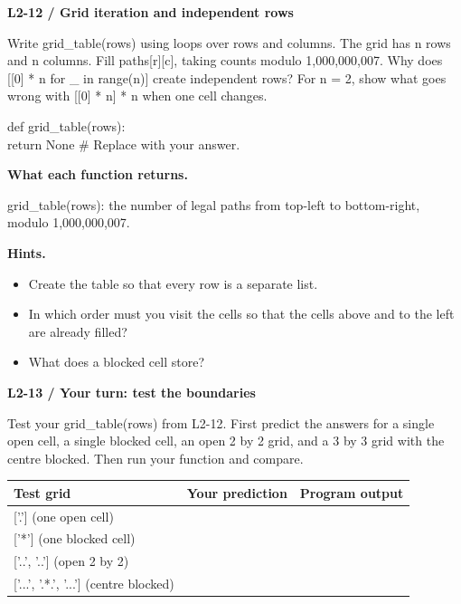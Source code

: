 \documentclass[11pt,a4paper]{article}
\begin{document}
\par\noindent\begin{minipage}{\linewidth}
\textbf{L2-12 / Grid iteration and independent rows}\par\smallskip Write grid\_table(rows) using loops over rows and columns. The grid has n rows and n columns. Fill paths[r][c], taking counts modulo 1,000,000,007. Why does [[0] * n for \_ in range(n)] create independent rows? For n = 2, show what goes wrong with [[0] * n] * n when one cell changes.\par
\par{}\par\smallskip\noindent\colorbox{codepaper}{\parbox{\dimexpr\linewidth-2\fboxsep\relax}{\small\ttfamily\raggedright def grid\_table(rows):\\\hspace*{2.4em}return None  \# Replace with your answer.}}\par
{\small\textbf{What each function returns.}\par grid\_table(rows): the number of legal paths from top-left to bottom-right, modulo 1,000,000,007.\par }
{\small\textbf{Hints.}}\begin{itemize}\item Create the table so that every row is a separate list.\item In which order must you visit the cells so that the cells above and to the left are already filled?\item What does a blocked cell store?\end{itemize}
\end{minipage}\par\vspace{4mm}
\par\noindent\begin{minipage}{\linewidth}
\textbf{L2-13 / Your turn: test the boundaries}\par\smallskip Test your grid\_table(rows) from L2-12. First predict the answers for a single open cell, a single blocked cell, an open 2 by 2 grid, and a 3 by 3 grid with the centre blocked. Then run your function and compare.\par
\par\medskip \begingroup\small\setlength{\tabcolsep}{4pt}\renewcommand{\arraystretch}{1.35}\begin{tabularx}{\linewidth}{>{\raggedright\arraybackslash}X>{\raggedright\arraybackslash}X>{\raggedright\arraybackslash}X}\toprule\textbf{Test grid} & \textbf{Your prediction} & \textbf{Program output}\\\midrule
{}['.']  (one open cell) &  & \\
{}['*']  (one blocked cell) &  & \\
{}['..', '..']  (open 2 by 2) &  & \\
{}['...', '.*.', '...']  (centre blocked) &  & \\
\bottomrule\end{tabularx}\endgroup\par\medskip 
\end{minipage}\par\vspace{4mm}
\end{document}
